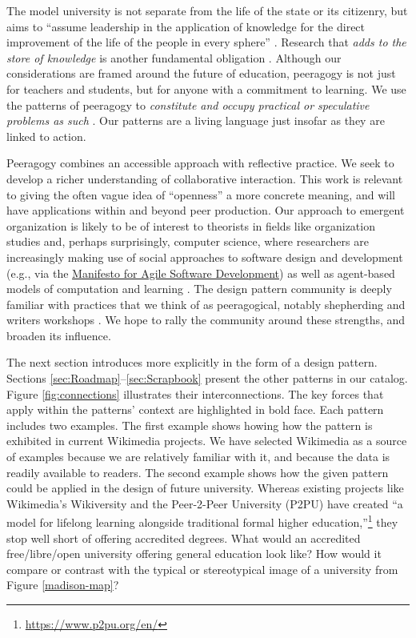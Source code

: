 The model university is not separate from the life of the state or its
citizenry, but aims to ``assume leadership in the application of
knowledge for the direct improvement of the life of the people in
every sphere'' \cite[p.~88]{curti1949university}. Research that \emph{adds
to the store of knowledge} is another fundamental
obligation \cite[p.~550]{curti1949university}.  Although 
our considerations are framed around the future of education, peeragogy
is not just for teachers and students, but for anyone with a
commitment to learning.  We use the patterns of peeragogy to
\emph{constitute and occupy practical or speculative problems as such}
\cite[p.~204]{deleuze1994difference}.
%
Our patterns are a living language just insofar as they are linked to
action.


Peeragogy combines an accessible approach with reflective practice.   We seek to develop a richer understanding of collaborative interaction.  This work is relevant to giving the often vague idea of ``openness'' a more concrete meaning, and will have applications within and beyond peer production.  Our approach to emergent organization is likely to be of interest to theorists in fields like organization studies and, perhaps surprisingly, computer science, where researchers are increasingly making use of social approaches to software design and development (e.g., via the \href{http://www.agilemanifesto.org/}{Manifesto for Agile Software Development}) as well as agent-based models of computation and learning \cite{minsky1967programming,poetry-workshop}.  The design pattern community is deeply familiar with practices that we think of as peeragogical, notably shepherding and writers workshops \cite{gabriel2002writer}.  We hope to rally the community around these strengths, and broaden its influence.

The next section introduces  more explicitly in the form of a design pattern.  Sections \ref{sec:Roadmap}--\ref{sec:Scrapbook} present the other patterns in our catalog.  Figure \ref{fig:connections} illustrates their interconnections.  The key forces that apply within the patterns' context are highlighted in bold face.  Each pattern includes two examples. The first example shows howing how the pattern is exhibited in current Wikimedia projects.  We have selected Wikimedia as a source of examples because we are relatively familiar with it, and because the data is readily available to readers.  The second example shows how the given pattern could be applied in the design of future university.  Whereas existing projects like Wikimedia's Wikiversity and the Peer-2-Peer University (P2PU) have created ``a model for lifelong learning alongside traditional formal higher education,''\footnote{\url{https://www.p2pu.org/en/}} they stop well short of offering accredited degrees.  What would an accredited free/libre/open university offering general education look like?  How would it compare or contrast with the typical or stereotypical image of a university from Figure \ref{madison-map}?

